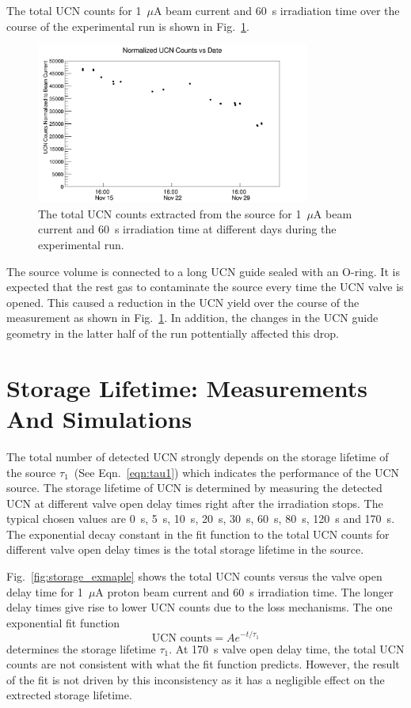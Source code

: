 

The total UCN counts for 1~$\mu$A beam current and 60~s irradiation
time over the course of the experimental run is shown in
Fig.~\ref{fig:UCNCounts_time}. 
\begin{figure}[h]
  \centering
  \includegraphics[width=0.8\textwidth]{UCNCounts_vs_Time.png}
  \caption{The total UCN counts extracted from the source for 1~$\mu$A
    beam current and 60~s irradiation time at different days during
    the experimental run. }
  \label{fig:UCNCounts_time}
\end{figure}
The source volume is connected to a long UCN guide sealed with an
O-ring. It is expected that the rest gas to contaminate the source
every time the UCN valve is opened. This caused a reduction in the UCN
yield over the course of the measurement as shown in
Fig.~\ref{fig:UCNCounts_time}. In addition, the changes in the UCN
guide geometry in the latter half of the run pottentially affected
this drop.

\section{Storage Lifetime: Measurements And
  Simulations\label{storagelifetime}}

The total number of detected UCN strongly depends on the storage
lifetime of the source $\tau_1$~(See Eqn.~\ref{eqn:tau1}) which
indicates the performance of the UCN source. The storage lifetime of
UCN is determined by measuring the detected UCN at different valve
open delay times right after the irradiation stops. The typical chosen
values are 0~s, 5~s, 10~s, 20~s, 30~s, 60~s, 80~s, 120~s and
170~s. The exponential decay constant in the fit function to the total
UCN counts for different valve open delay times is the total storage
lifetime in the source.

Fig.~\ref{fig:storage_exmaple} shows the total UCN counts versus the
valve open delay time for 1~$\mu$A proton beam current and 60~s irradiation
time. The longer delay times give rise to lower UCN counts due to the
loss mechanisms. The one exponential fit function
\begin{equation}
\text{UCN counts} = A e^{-t/\tau_1}
\end{equation}
determines the storage lifetime $\tau_1$. At 170~s valve open delay
time, the total UCN counts are not consistent with what the fit
function predicts. However, the result of the fit is not driven by
this inconsistency as it has a negligible effect on the extrected
storage lifetime.

